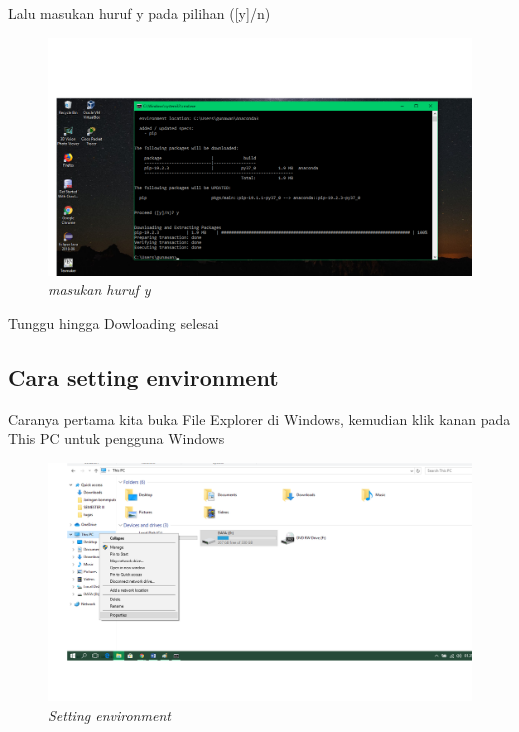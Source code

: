 \par Lalu masukan huruf y pada pilihan ([y]/n) 

\begin{figure}[!htbp]
    \centering
    \includegraphics[scale=0.3]{gambar/Instal pip done.png}
    \caption{\textit{masukan huruf y}}
    \label{Figure1}
\end{figure}

\par Tunggu hingga Dowloading selesai

\subsection{Cara setting environment}
\par Caranya pertama kita buka File Explorer di Windows, kemudian klik kanan pada This PC untuk pengguna Windows 

\begin{figure}[!htbp]
    \centering
    \includegraphics[scale=0.3]{gambar/cek ev.png}
    \caption{\textit{Setting environment}}
    \label{Figure1}
\end{figure}


